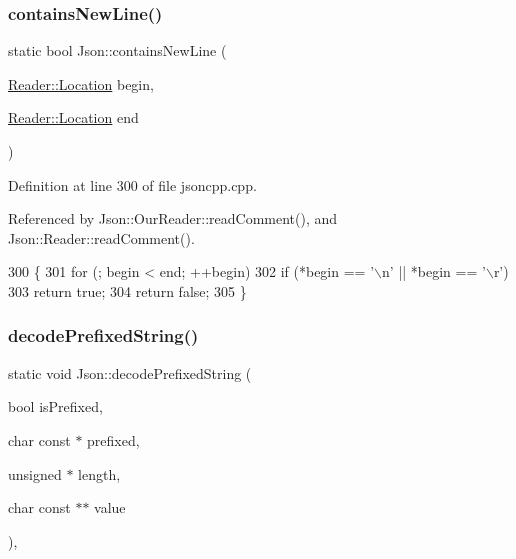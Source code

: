 \subsubsection{\texorpdfstring{contains\+New\+Line()}{containsNewLine()}}
{\footnotesize\ttfamily static bool Json\+::contains\+New\+Line (\begin{DoxyParamCaption}\item[{\hyperlink{class_json_1_1_reader_a46795b5b272bf79a7730e406cb96375a}{Reader\+::\+Location}}]{begin,  }\item[{\hyperlink{class_json_1_1_reader_a46795b5b272bf79a7730e406cb96375a}{Reader\+::\+Location}}]{end }\end{DoxyParamCaption})\hspace{0.3cm}{\ttfamily [static]}}



Definition at line 300 of file jsoncpp.\+cpp.



Referenced by Json\+::\+Our\+Reader\+::read\+Comment(), and Json\+::\+Reader\+::read\+Comment().


\begin{DoxyCode}
300                                                                       \{
301   \textcolor{keywordflow}{for} (; begin < end; ++begin)
302     \textcolor{keywordflow}{if} (*begin == \textcolor{charliteral}{'\(\backslash\)n'} || *begin == \textcolor{charliteral}{'\(\backslash\)r'})
303       \textcolor{keywordflow}{return} \textcolor{keyword}{true};
304   \textcolor{keywordflow}{return} \textcolor{keyword}{false};
305 \}
\end{DoxyCode}
\mbox{\label{namespace_json_aad8b4982c1acd164f541fba396ac9fb1}} 
\subsubsection{\texorpdfstring{decode\+Prefixed\+String()}{decodePrefixedString()}}
{\footnotesize\ttfamily static void Json\+::decode\+Prefixed\+String (\begin{DoxyParamCaption}\item[{bool}]{is\+Prefixed,  }\item[{char const $\ast$}]{prefixed,  }\item[{unsigned $\ast$}]{length,  }\item[{char const $\ast$$\ast$}]{value }\end{DoxyParamCaption})\hspace{0.3cm}{\ttfamily [inline]}, {\ttfamily [static]}}



